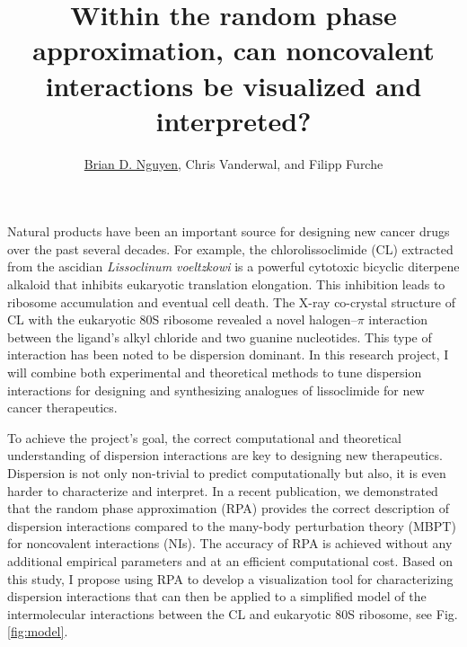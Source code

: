 \documentclass[11pt]{article}
\title{\vspace{-0.8in}\textbf{Within the random phase approximation,
    can noncovalent interactions be visualized and interpreted?}}
\author{\underline{Brian D. Nguyen}, Chris Vanderwal, and Filipp Furche}
\date{}%
\begin{document}
\maketitle
\vspace{-0.25in}
Natural products have been an important source for designing new cancer
drugs over the past several decades.\autocite{Dias12Metabolites2p303,Butler04JNatProd67p2141}
For example, the chlorolissoclimide (CL) extracted from the ascidian
\textit{Lissoclinum voeltzkowi} is a powerful cytotoxic bicyclic diterpene
alkaloid that inhibits eukaryotic translation elongation.\autocite{Robert06RNA12p717}
This inhibition leads to ribosome accumulation and eventual cell death. 
The X-ray co-crystal structure of CL with the eukaryotic 80S ribosome revealed
a novel halogen--$\pi$ interaction between the ligand's alkyl chloride and two
guanine nucleotides.\autocite{Imai08ProteinScience17p1129,Konst2017} This
type of interaction has been noted to be dispersion
dominant.\autocite{Riley08JChemTheoryComput4p232,Riley13PhysChemChemPhys15p17742,
  Sedlak14JPhysChemA118p3846} In this research project, I will combine both
experimental and theoretical methods to tune dispersion interactions for
designing and synthesizing analogues of lissoclimide for new cancer
therapeutics.

To achieve the project's goal, the correct computational and theoretical understanding of
dispersion interactions are key to designing new therapeutics. Dispersion is not
only non-trivial to predict computationally but also, it is even harder to
characterize and interpret. In a recent publication, we demonstrated that
the random phase approximation (RPA) provides the correct description of dispersion
interactions compared to the many-body perturbation theory (MBPT) for noncovalent
interactions (NIs).\autocite{Nguyen20JChemTheoryComput16p2258} The accuracy of RPA
is achieved without any additional empirical parameters and at an efficient
computational cost. Based on this study, I propose using RPA to develop a
visualization tool for characterizing dispersion interactions that can then be
applied to a simplified model of the intermolecular interactions between
the CL and eukaryotic 80S ribosome, see Fig. \ref{fig:model}.
\end{document}
